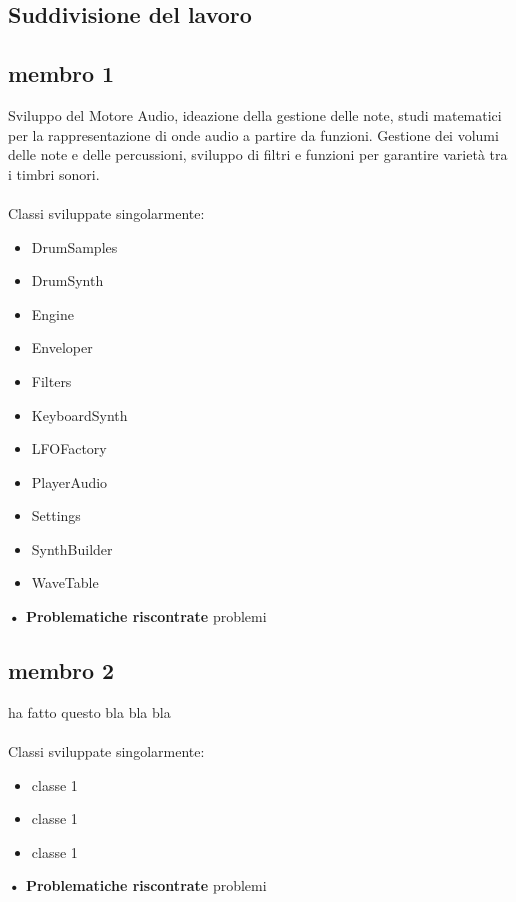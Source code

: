 \documentclass[a4paper,12pt]{report}
\begin{document}
\subsection*{Suddivisione del lavoro}
\subsection{membro 1}
Sviluppo del Motore Audio, ideazione della gestione delle note, studi matematici per la rappresentazione di onde audio a partire da funzioni.
Gestione dei volumi delle note e delle percussioni, sviluppo di filtri e funzioni per garantire varietà tra i timbri sonori. \\ \\
Classi sviluppate singolarmente:
{
	\begin{itemize}
		\item DrumSamples
		\item DrumSynth
		\item Engine
		\item Enveloper
		\item Filters
		\item KeyboardSynth
		\item LFOFactory
		\item PlayerAudio
		\item Settings
		\item SynthBuilder
		\item WaveTable
	\end{itemize}
}
\hfill\break
\textbf{• Problematiche riscontrate}\hfill\break
problemi 
\newpage

\subsection{membro 2}
ha fatto questo bla bla bla \\ \\
Classi sviluppate singolarmente:
{
	\begin{itemize}
		\item classe 1
		\item classe 1
		\item classe 1
	\end{itemize}
}
\hfill\break
\textbf{• Problematiche riscontrate}\hfill\break
problemi 
\newpage
\end{document}
